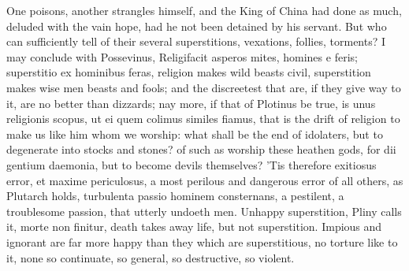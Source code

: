 {One poisons, another strangles himself, and the King of China had done
as much, deluded with the vain hope, had he not been detained by his
servant. But who can sufficiently tell of their several superstitions,
vexations, follies, torments? I may conclude with Possevinus,
Religifacit asperos mites, homines e feris; superstitio ex hominibus
feras, religion makes wild beasts civil, superstition makes wise men
beasts and fools; and the discreetest that are, if they give way to it,
are no better than dizzards; nay more, if that of Plotinus be true, is
unus religionis scopus, ut ei quem colimus similes fiamus, that is the
drift of religion to make us like him whom we worship: what shall be
the end of idolaters, but to degenerate into stocks and stones? of such
as worship these heathen gods, for dii gentium daemonia, but to
become devils themselves? 'Tis therefore exitiosus error, et maxime
periculosus, a most perilous and dangerous error of all others, as
Plutarch holds, turbulenta passio hominem consternans, a
pestilent, a troublesome passion, that utterly undoeth men. Unhappy
superstition, Pliny calls it, morte non finitur, death takes away
life, but not superstition. Impious and ignorant are far more happy
than they which are superstitious, no torture like to it, none so
continuate, so general, so destructive, so violent.

}
